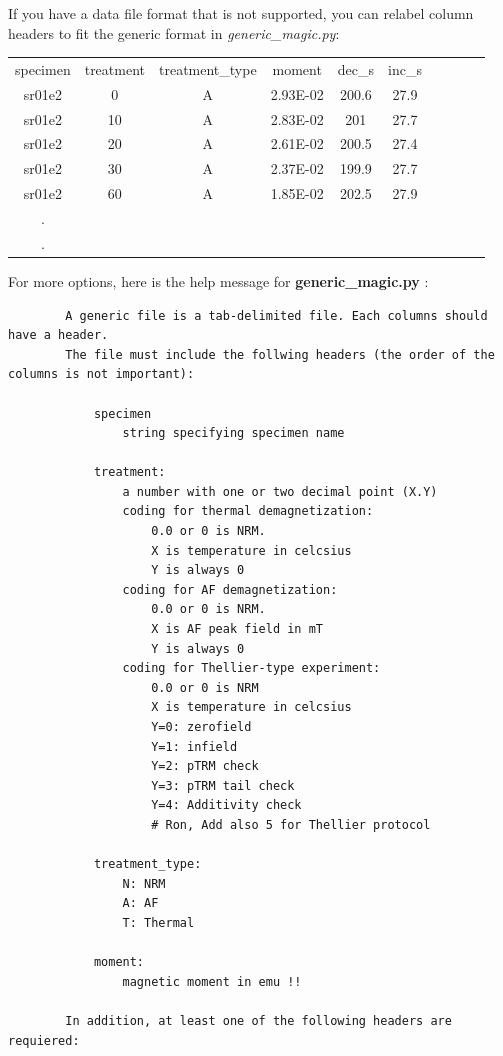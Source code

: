 \documentclass[11pt]{book}
\begin{document}
{{If you have a data file format that is not supported, you can relabel column headers to fit the generic format in {\it generic\_magic.py}:

\begin{tabular}{cccccccccc}
specimen & treatment & treatment\_type & moment & dec\_s & inc\_s \\
sr01e2 & 0 & A & 2.93E-02 & 200.6 & 27.9 \\
sr01e2 & 10 & A & 2.83E-02 & 201 & 27.7 \\
sr01e2 & 20 & A & 2.61E-02 & 200.5 & 27.4 \\
sr01e2 & 30 & A & 2.37E-02 & 199.9 & 27.7 \\
sr01e2 & 60 & A & 1.85E-02 & 202.5 & 27.9 \\
.\\
.\\
\end{tabular}

For more options, here is  the help message for {\bf generic\_magic.py }:
\begin{verbatim}
        A generic file is a tab-delimited file. Each columns should have a header.
        The file must include the follwing headers (the order of the columns is not important):

            specimen
                string specifying specimen name

            treatment:
                a number with one or two decimal point (X.Y)
                coding for thermal demagnetization:
                    0.0 or 0 is NRM.
                    X is temperature in celcsius
                    Y is always 0
                coding for AF demagnetization:
                    0.0 or 0 is NRM.
                    X is AF peak field in mT
                    Y is always 0
                coding for Thellier-type experiment:
                    0.0 or 0 is NRM
                    X is temperature in celcsius
                    Y=0: zerofield
                    Y=1: infield
                    Y=2: pTRM check
                    Y=3: pTRM tail check
                    Y=4: Additivity check
                    # Ron, Add also 5 for Thellier protocol

            treatment_type:
                N: NRM
                A: AF
                T: Thermal

            moment:
                magnetic moment in emu !!

        In addition, at least one of the following headers are requiered:


\end{verbatim}}}
\end{document}
